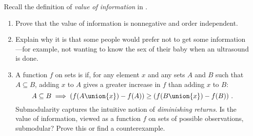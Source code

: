 \begin{exercise}%
Recall the definition of {\em value of information} in .
\begin{enumerate}
\item Prove that the value of information is nonnegative and order independent.
\item Explain why it is that some people would prefer not to get some information---for example, not
wanting to know the sex of their baby when an ultrasound is done.
\item A function \(f\) on sets is  if, for any element \(x\) and any 
sets \(A\) and \(B\) such that \(A\subseteq B\), adding \(x\) to \(A\) gives a greater increase in \(f\) than adding \(x\) to \(B\):
\[
  A\subseteq B \implies (f(A\union \{x\}) - f(A)) \geq (f(B\union \{x\}) - f(B))\ .
\]
Submodularity captures the intuitive notion of {\em diminishing returns}. Is the value of information, viewed as a function \(f\) on sets of possible observations, submodular? Prove this or find a counterexample.
\end{enumerate}
\end{exercise} 






